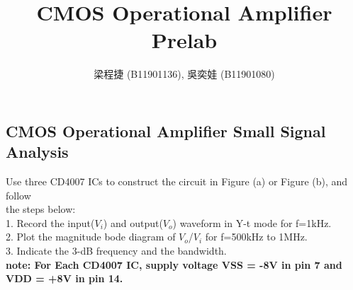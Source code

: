 \documentclass{article}
\title{CMOS Operational Amplifier Prelab}
\author{梁程捷 (B11901136), 吳奕娃 (B11901080)}
\date{}
\begin{document}
\begin{CJK*}{UTF8}{bkai}

\maketitle

\section*{CMOS Operational Amplifier Small Signal Analysis}
Use three CD4007 ICs to construct the circuit in Figure (a) or Figure (b), and follow \\
the steps below: \\
1. Record the input($V_i$) and output($V_o$) waveform in Y-t mode for f=1\unit{\kilo\hertz}. \\
2. Plot the magnitude bode diagram of $V_o$/$V_i$ for f=500\unit{\kilo\hertz} to 1\unit{\mega\hertz}. \\
3. Indicate the 3-dB frequency and the bandwidth. \\
\textbf{note: For Each CD4007 IC, supply voltage VSS = -8V in pin 7 and VDD = +8V in pin 14.} \\

\begin{figure}[h]
    \begin{center}
    

\end{center}
\end{figure}
\end{CJK*}
\end{document}
